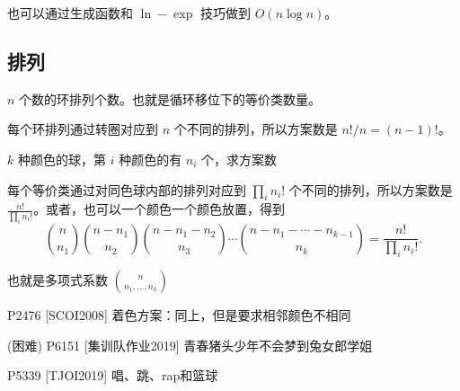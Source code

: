     \begin{remark}
        也可以通过生成函数和 $\ln-\exp$ 技巧做到 $O(n\log n)$。
    \end{remark}

\subsection{排列}
    \begin{example}[环排列]
        $n$ 个数的环排列个数。也就是循环移位下的等价类数量。
    \end{example}
    \begin{solution}
        每个环排列通过转圈对应到 $n$ 个不同的排列，所以方案数是 $n!/n=(n-1)!$。
    \end{solution}

    \begin{example}[多重排列]
        $k$ 种颜色的球，第 $i$ 种颜色的有 $n_i$ 个，求方案数
    \end{example}
    \begin{solution}
        每个等价类通过对同色球内部的排列对应到 $\prod_i n_i!$ 个不同的排列，所以方案数是 $\frac{n!}{\prod_i n_i!}$。或者，也可以一个颜色一个颜色放置，得到 
    $$
    \binom{n}{n_1}\binom{n-n_1}{n_2}\binom{n-n_1-n_2}{n_3}\cdots\binom{n-n_1-\cdots-n_{k-1}}{n_k}=\frac{n!}{\prod_i n_i!}.
    $$

    也就是多项式系数 $\binom{n}{n_1,\ldots,n_k}$
    \end{solution}

    \begin{example}[（困难）相邻颜色不同的多重排列]
        P2476 [SCOI2008] 着色方案：同上，但是要求相邻颜色不相同
    \end{example}
    
    \begin{example}
        (困难) P6151 [集训队作业2019] 青春猪头少年不会梦到兔女郎学姐
    \end{example}
    
    \begin{example}
        P5339 [TJOI2019] 唱、跳、rap和篮球
    \end{example}


